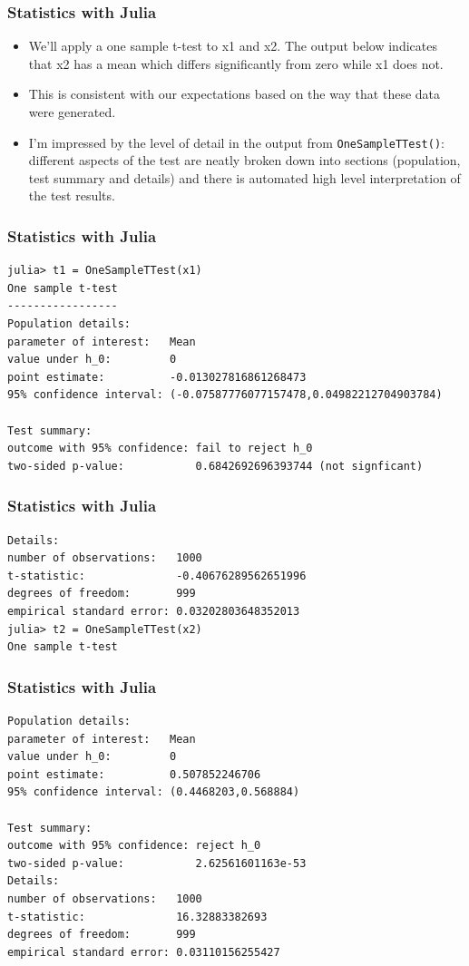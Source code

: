 \documentclass[Master.tex]{subfiles}
\begin{document}
\begin{frame}[fragile]
	\frametitle{Statistics with Julia}
	\large
\begin{itemize}
	\item We’ll apply a one sample t-test to x1 and x2. The output below indicates that x2 has a mean which differs significantly from zero while x1 does not. 
	\item This is consistent with our expectations based on the way that these data were generated.
	\item  I’m impressed by the level of detail in the output from \texttt{OneSampleTTest()}: different aspects of the test are neatly broken down into sections (population, test summary and details) and there is automated high level interpretation of the test results.
\end{itemize}

\end{frame}
\begin{frame}[fragile]
	\frametitle{Statistics with Julia}
	\large
\begin{verbatim}
julia> t1 = OneSampleTTest(x1)
One sample t-test
-----------------
Population details:
parameter of interest:   Mean
value under h_0:         0
point estimate:          -0.013027816861268473
95% confidence interval: (-0.07587776077157478,0.04982212704903784)

Test summary:
outcome with 95% confidence: fail to reject h_0
two-sided p-value:           0.6842692696393744 (not signficant)
\end{verbatim}
\end{frame}
\begin{frame}[fragile]
	\frametitle{Statistics with Julia}
	\large
\begin{verbatim}
Details:
number of observations:   1000
t-statistic:              -0.40676289562651996
degrees of freedom:       999
empirical standard error: 0.03202803648352013
julia> t2 = OneSampleTTest(x2)
One sample t-test
\end{verbatim}
\end{frame}
\begin{frame}[fragile]
	\frametitle{Statistics with Julia}
	\large
	\begin{verbatim}
Population details:
parameter of interest:   Mean
value under h_0:         0
point estimate:          0.507852246706
95% confidence interval: (0.4468203,0.568884)

Test summary:
outcome with 95% confidence: reject h_0
two-sided p-value:           2.62561601163e-53 
Details:
number of observations:   1000
t-statistic:              16.32883382693
degrees of freedom:       999
empirical standard error: 0.03110156255427
\end{verbatim}
\end{frame}
\end{document}

